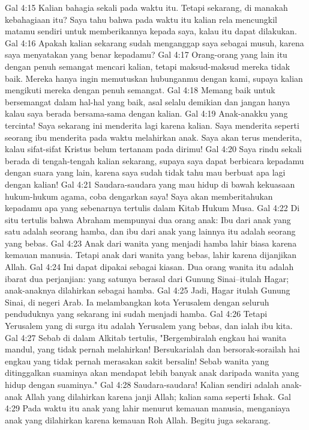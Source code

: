 Gal 4:15  Kalian bahagia sekali pada waktu itu. Tetapi sekarang, di manakah kebahagiaan itu? Saya tahu bahwa pada waktu itu kalian rela mencungkil matamu sendiri untuk memberikannya kepada saya, kalau itu dapat dilakukan.
Gal 4:16  Apakah kalian sekarang sudah menganggap saya sebagai musuh, karena saya menyatakan yang benar kepadamu?
Gal 4:17  Orang-orang yang lain itu dengan penuh semangat mencari kalian, tetapi maksud-maksud mereka tidak baik. Mereka hanya ingin memutuskan hubunganmu dengan kami, supaya kalian mengikuti mereka dengan penuh semangat.
Gal 4:18  Memang baik untuk bersemangat dalam hal-hal yang baik, asal selalu demikian dan jangan hanya kalau saya berada bersama-sama dengan kalian.
Gal 4:19  Anak-anakku yang tercinta! Saya sekarang ini menderita lagi karena kalian. Saya menderita seperti seorang ibu menderita pada waktu melahirkan anak. Saya akan terus menderita, kalau sifat-sifat Kristus belum tertanam pada dirimu!
Gal 4:20  Saya rindu sekali berada di tengah-tengah kalian sekarang, supaya saya dapat berbicara kepadamu dengan suara yang lain, karena saya sudah tidak tahu mau berbuat apa lagi dengan kalian!
Gal 4:21  Saudara-saudara yang mau hidup di bawah kekuasaan hukum-hukum agama, coba dengarkan saya! Saya akan memberitahukan kepadamu apa yang sebenarnya tertulis dalam Kitab Hukum Musa.
Gal 4:22  Di situ tertulis bahwa Abraham mempunyai dua orang anak: Ibu dari anak yang satu adalah seorang hamba, dan ibu dari anak yang lainnya itu adalah seorang yang bebas.
Gal 4:23  Anak dari wanita yang menjadi hamba lahir biasa karena kemauan manusia. Tetapi anak dari wanita yang bebas, lahir karena dijanjikan Allah.
Gal 4:24  Ini dapat dipakai sebagai kiasan. Dua orang wanita itu adalah ibarat dua perjanjian: yang satunya berasal dari Gunung Sinai--itulah Hagar; anak-anaknya dilahirkan sebagai hamba.
Gal 4:25  Jadi, Hagar itulah Gunung Sinai, di negeri Arab. Ia melambangkan kota Yerusalem dengan seluruh penduduknya yang sekarang ini sudah menjadi hamba.
Gal 4:26  Tetapi Yerusalem yang di surga itu adalah Yerusalem yang bebas, dan ialah ibu kita.
Gal 4:27  Sebab di dalam Alkitab tertulis, "Bergembiralah engkau hai wanita mandul, yang tidak pernah melahirkan! Bersukarialah dan bersorak-sorailah hai engkau yang tidak pernah merasakan sakit bersalin! Sebab wanita yang ditinggalkan suaminya akan mendapat lebih banyak anak daripada wanita yang hidup dengan suaminya."
Gal 4:28  Saudara-saudara! Kalian sendiri adalah anak-anak Allah yang dilahirkan karena janji Allah; kalian sama seperti Ishak.
Gal 4:29  Pada waktu itu anak yang lahir menurut kemauan manusia, menganiaya anak yang dilahirkan karena kemauan Roh Allah. Begitu juga sekarang.
